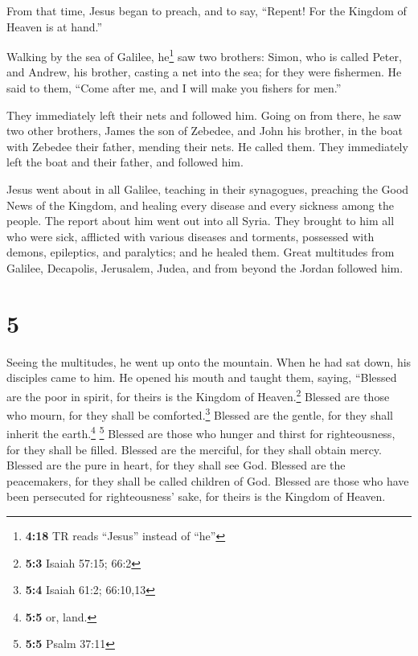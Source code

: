  From that time, Jesus began to preach, and to say,
``Repent! For the Kingdom of Heaven is at hand.''

 Walking by the sea of Galilee, he\footnote{\textbf{4:18}
  TR reads ``Jesus'' instead of ``he''} saw two brothers: Simon, who is
called Peter, and Andrew, his brother, casting a net into the sea; for
they were fishermen.  He said to them, ``Come after me,
and I will make you fishers for men.''

 They immediately left their nets and followed him.
 Going on from there, he saw two other brothers, James
the son of Zebedee, and John his brother, in the boat with Zebedee their
father, mending their nets. He called them.  They
immediately left the boat and their father, and followed him.

 Jesus went about in all Galilee, teaching in their
synagogues, preaching the Good News of the Kingdom, and healing every
disease and every sickness among the people.  The report
about him went out into all Syria. They brought to him all who were
sick, afflicted with various diseases and torments, possessed with
demons, epileptics, and paralytics; and he healed them. 
Great multitudes from Galilee, Decapolis, Jerusalem, Judea, and from
beyond the Jordan followed him.

\hypertarget{section-4}{%
\section{5}\label{section-4}}

 Seeing the multitudes, he went up onto the mountain. When
he had sat down, his disciples came to him.  He opened his
mouth and taught them, saying,  ``Blessed are the poor in
spirit, for theirs is the Kingdom of Heaven.\footnote{\textbf{5:3}
  Isaiah 57:15; 66:2}  Blessed are those who mourn, for
they shall be comforted.\footnote{\textbf{5:4} Isaiah 61:2; 66:10,13}
 Blessed are the gentle, for they shall inherit the
earth.\footnote{\textbf{5:5} or, land.} \footnote{\textbf{5:5} Psalm
  37:11}  Blessed are those who hunger and thirst for
righteousness, for they shall be filled.  Blessed are the
merciful, for they shall obtain mercy.  Blessed are the
pure in heart, for they shall see God.  Blessed are the
peacemakers, for they shall be called children of God. 
Blessed are those who have been persecuted for righteousness' sake, for
theirs is the Kingdom of Heaven.

